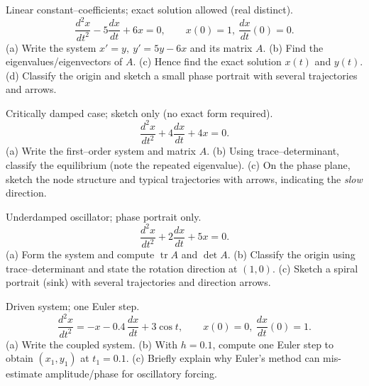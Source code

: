 \documentclass[11pt]{article}
\def\textbf#1{#1}%
\newcounter{question}
\begin{document}
\begin{question}
\textbf{Linear constant–coefficients; exact solution allowed (real distinct).}
\[
\frac{d^{2}x}{dt^{2}}-5\frac{dx}{dt}+6x=0,\qquad x(0)=1,\ \frac{dx}{dt}(0)=0.
\]
(a) Write the system \(x'=y,\ y'=5y-6x\) and its matrix \(A\).  
(b) Find the eigenvalues/eigenvectors of \(A\).  
(c) Hence find the exact solution \(x(t)\) and \(y(t)\).  
(d) Classify the origin and sketch a small phase portrait with several trajectories and arrows.
\end{question}

\begin{question}
\textbf{Critically damped case; sketch only (no exact form required).}
\[
\frac{d^{2}x}{dt^{2}}+4\frac{dx}{dt}+4x=0.
\]
(a) Write the first–order system and matrix \(A\).  
(b) Using trace–determinant, classify the equilibrium (note the repeated eigenvalue).  
(c) On the phase plane, sketch the node structure and typical trajectories with arrows, indicating the \emph{slow} direction.
\begin{center}
\end{center}
\end{question}

\begin{question}
\textbf{Underdamped oscillator; phase portrait only.}
\[
\frac{d^{2}x}{dt^{2}}+2\frac{dx}{dt}+5x=0.
\]
(a) Form the system and compute \(\operatorname{tr}A\) and \(\det A\).  
(b) Classify the origin using trace–determinant and state the rotation direction at \((1,0)\).  
(c) Sketch a spiral portrait (sink) with several trajectories and direction arrows.
\end{question}

\begin{question}
\textbf{Driven system; one Euler step.}
\[
\frac{d^{2}x}{dt^{2}}=-x-0.4\,\frac{dx}{dt}+3\cos t,\qquad x(0)=0,\ \frac{dx}{dt}(0)=1.
\]
(a) Write the coupled system.  
(b) With \(h=0.1\), compute one Euler step to obtain \((x_1,y_1)\) at \(t_1=0.1\).  
(c) Briefly explain why Euler’s method can mis-estimate amplitude/phase for oscillatory forcing.
\end{question}
\end{document}

